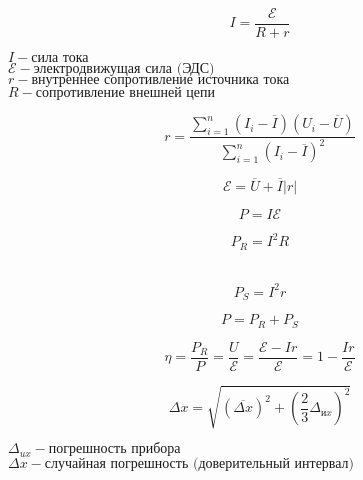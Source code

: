 \[
I = \frac{\mathscr{E}}{R + r}
\]

\begin{center}
    $I - \text{сила тока}$ \\
    $\mathscr{E} - \text{электродвижущая сила (ЭДС)}$ \\
    $r - \text{внутреннее сопротивление источника тока}$ \\
    $R - \text{сопротивление внешней цепи}$
\end{center}

\vspace{0.1cm}

\[
r = \frac{\sum\limits_{i=1}^{n}(I_i - \overline{I})(U_i - \overline{U})}{\sum\limits_{i=1}^{n}(I_i - \overline{I})^2}
\]

\vspace{0.1cm}

\[
\mathscr{E} = \overline{U} + \overline{I}|r|
\]

\vspace{0.1cm}

\[
P = I\mathscr{E}
\]

\[
P_{R} = I^2R
\]\

\[
P_{S} = I^2r
\]

\[
P = P_{R} + P_{S}
\]

\vspace{0.1cm}

\[
\eta = \frac{P_{R}}{P} = \frac{U}{\mathscr{E}} = \frac{\mathscr{E} - Ir}{\mathscr{E}} = 1 - \frac{Ir}{\mathscr{E}}
\]

\vspace{0.1cm}

\[
\Delta x = \sqrt{\left(\overline{\Delta x}\right)^2 + \left(\frac{2}{3} \Delta_{\text{и}x}\right)^2}
\]

\begin{center}
    $\Delta_{ux} - \text{погрешность прибора}$ \\
    $\Delta x - \text{случайная погрешность (доверительный интервал)}$
\end{center}

\vspace{0.1cm}

